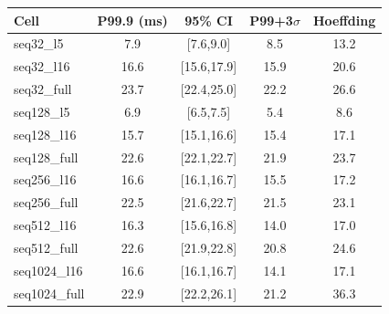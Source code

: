\begin{tabular}{lcccc}\toprule
Cell & P99.9 (ms) & 95\% CI & P99+3$\sigma$ & Hoeffding\\
\midrule
seq32_l5 & 7.9 & [7.6,9.0] & 8.5 & 13.2\\
seq32_l16 & 16.6 & [15.6,17.9] & 15.9 & 20.6\\
seq32_full & 23.7 & [22.4,25.0] & 22.2 & 26.6\\
seq128_l5 & 6.9 & [6.5,7.5] & 5.4 & 8.6\\
seq128_l16 & 15.7 & [15.1,16.6] & 15.4 & 17.1\\
seq128_full & 22.6 & [22.1,22.7] & 21.9 & 23.7\\
seq256_l16 & 16.6 & [16.1,16.7] & 15.5 & 17.2\\
seq256_full & 22.5 & [21.6,22.7] & 21.5 & 23.1\\
seq512_l16 & 16.3 & [15.6,16.8] & 14.0 & 17.0\\
seq512_full & 22.6 & [21.9,22.8] & 20.8 & 24.6\\
seq1024_l16 & 16.6 & [16.1,16.7] & 14.1 & 17.1\\
seq1024_full & 22.9 & [22.2,26.1] & 21.2 & 36.3\\
\bottomrule\end{tabular}
